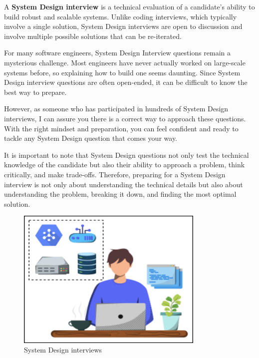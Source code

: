 

A \textbf{System Design interview} is a technical evaluation of a candidate's ability to build robust and scalable systems. Unlike coding interviews, which typically involve a single solution, System Design interviews are open to discussion and involve multiple possible solutions that can be re-iterated.

For many software engineers, System Design Interview questions remain a mysterious challenge. Most engineers have never actually worked on large-scale systems before, so explaining how to build one seems daunting. Since System Design interview questions are often open-ended, it can be difficult to know the best way to prepare.

However, as someone who has participated in hundreds of System Design interviews, I can assure you there is a correct way to approach these questions. With the right mindset and preparation, you can feel confident and ready to tackle any System Design question that comes your way.

It is important to note that System Design questions not only test the technical knowledge of the candidate but also their ability to approach a problem, think critically, and make trade-offs. Therefore, preparing for a System Design interview is not only about understanding the technical details but also about understanding the problem, breaking it down, and finding the most optimal solution.

\begin{figure}[htbp]
 \centering
 \includegraphics[width=0.8\textwidth]{Images/chapter_1/section_4771234193080320/4929411824877568.png}
 \caption{System Design interviews}
\end{figure}

